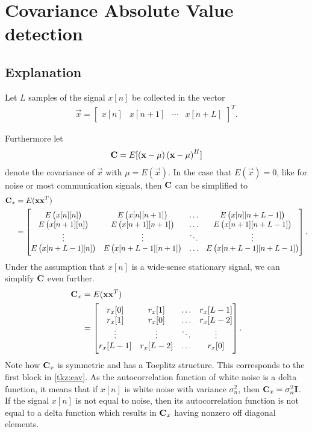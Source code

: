 \documentclass[a4paper, openany, oneside]{memoir}
\begin{document}
\section{Covariance Absolute Value detection}\label{sec:cav_derivation}

\subsection{Explanation}
Let $L$ samples of the signal $x[n]$ be collected in the vector
\begin{align*}
    \vec{x} = \begin{bmatrix}x[n]& x[n+1]& \cdots& x[n+L]\end{bmatrix}^T.
\end{align*}

Furthermore let
\begin{align*}
    \boldsymbol{\mathbf{C}} = E[\left(\boldsymbol{\mathbf{x}} - \mu \right)\left(\boldsymbol{\mathbf{x}} - \mu \right)^H]
\end{align*}
denote the covariance of $\vec{x}$ with $\mu = E(\vec{x})$. In the case that $E\left(\vec{x}\right)=0$, like for noise or most communication signals, then $\boldsymbol{\mathbf{C}}$ can be simplified to
\begin{align*}
\boldsymbol{\mathbf{C}}_x &= E(\boldsymbol{\mathbf{x}}\boldsymbol{\mathbf{x}}^T) \\
&= \begin{bmatrix} 
E\left(x[n][n]\right) & E\left(x[n][n+1]\right) & \ldots & E\left(x[n][n+L-1]\right) \\
E\left(x[n+1][n]\right) & E\left(x[n+1][n+1]\right) & \ldots & E\left(x[n+1][n+L-1]\right) \\
\vdots & \vdots & \ddots & \vdots \\
E\left(x[n+L-1][n]\right) & E\left(x[n+L-1][n+1]\right) & \ldots & E\left(x[n+L-1][n+L-1]\right) \\
\end{bmatrix}.
\end{align*}
Under the assumption that $x[n]$ is a wide-sense stationary signal, we can simplify $\boldsymbol{\mathbf{C}}$ even further. 
\begin{align*}
\boldsymbol{\mathbf{C}}_x&= E(\boldsymbol{\mathbf{x}}\boldsymbol{\mathbf{x}}^T) \\
&= \begin{bmatrix} 
r_x[0] & r_x[1] & \ldots & r_x[L-1] \\
r_x[1] & r_x[0] & \ldots & r_x[L-2] \\
\vdots & \vdots & \ddots & \vdots \\
r_x[L-1] & r_x[L-2] & \ldots & r_x[0] \\
\end{bmatrix}.
\end{align*}
Note how $\boldsymbol{\mathbf{C}}_x$ is symmetric and has a Toeplitz structure. This corresponds to the first block in \cref{tkz:cav}. As  the autocorrelation function of white noise is a delta function, it means that  if $x[n]$ is white noise with variance $\sigma_n^2$, then $\boldsymbol{\mathbf{C}}_x = \sigma_n^2\boldsymbol{\mathbf{I}}$.
If the signal $x[n]$ is not equal to noise, then its autocorrelation function is not equal to a delta function which results in $\boldsymbol{\mathbf{C}}_x$ having nonzero off diagonal elements.
\end{document}
